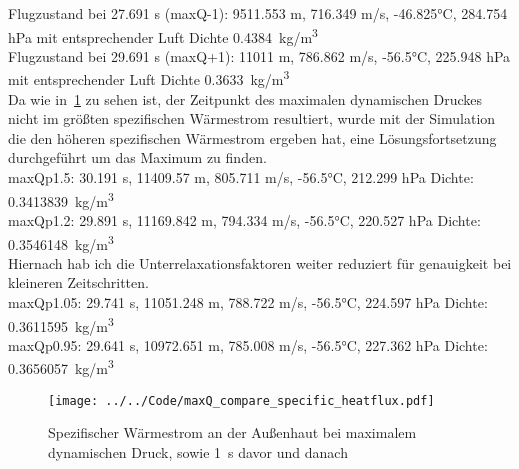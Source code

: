 Flugzustand bei 27.691 s (maxQ-1): 9511.553 m, 716.349 m/s, -46.825°C, 284.754 hPa mit entsprechender Luft Dichte \SI{0.4384}{kg/m^3}\\

Flugzustand bei 29.691 s (maxQ+1): 11011 m, 786.862 m/s, -56.5°C, 225.948 hPa mit entsprechender Luft Dichte \SI{0.3633}{kg/m^3}\\

Da wie in~\ref{fig:spezifischer_waermestrom_maxQ_simulationen} zu sehen ist, der Zeitpunkt des maximalen dynamischen Druckes nicht im größten spezifischen
Wärmestrom resultiert, wurde mit der Simulation die den höheren spezifischen Wärmestrom ergeben hat, eine Lösungsfortsetzung durchgeführt um das Maximum zu finden.\\

maxQp1.5: 30.191 s, 11409.57 m, 805.711 m/s, -56.5°C, 212.299 hPa Dichte: \SI{0.3413839}{kg/m^3}\\
maxQp1.2: 29.891 s, 11169.842 m, 794.334 m/s, -56.5°C, 220.527 hPa Dichte: \SI{0.3546148}{kg/m^3}\\
Hiernach hab ich die Unterrelaxationsfaktoren weiter reduziert für genauigkeit bei kleineren Zeitschritten.\\
maxQp1.05: 29.741 s, 11051.248 m, 788.722 m/s, -56.5°C, 224.597 hPa Dichte: \SI{0.3611595}{kg/m^3}\\
maxQp0.95: 29.641 s, 10972.651 m, 785.008 m/s, -56.5°C, 227.362 hPa Dichte: \SI{0.3656057}{kg/m^3}\\
\begin{figure}[H]
  \centering
  \texttt{[image: ../../Code/maxQ\_compare\_specific\_heatflux.pdf]}
  \caption{Spezifischer Wärmestrom an der Außenhaut bei maximalem dynamischen Druck, sowie \SI{1}{s} davor und danach}\label{fig:spezifischer_waermestrom_maxQ_simulationen}
\end{figure}